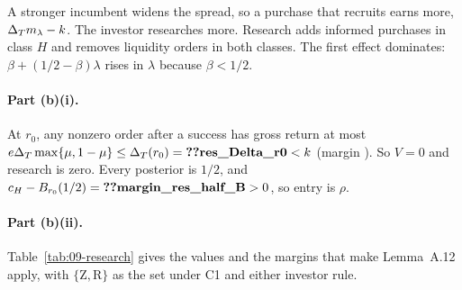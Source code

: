 \begin{intuition}
A stronger incumbent widens the spread, so a purchase that recruits earns more, \(\Delta_T m_\lambda-k\). The investor researches
more. Research adds informed purchases in class \(H\) and removes liquidity orders in both classes.
The first effect dominates: \(\beta+(1/2-\beta)\lambda\) rises in \(\lambda\) because \(\beta<1/2\).
\end{intuition}

\paragraph{Part (b)(i).} At \(r_0\), any nonzero order after a success has gross return at most
\(e\DT\max\{\mu,1-\mu\}\le\DT(r_0)=\reg{res_Delta_r0}<k\) (margin ). So \(V=0\) and research is zero.
Every posterior is \(1/2\), and \(c_H-B_{r_0}(1/2)=\reg{margin_res_half_B}>0\), so entry is \(\rho\).

\paragraph{Part (b)(ii).} Table~\ref{tab:09-research} gives the values and the margins that make Lemma~A.12 apply, with
\(\{\mathrm Z,\mathrm R\}\) as the set under C1 and either investor rule.

